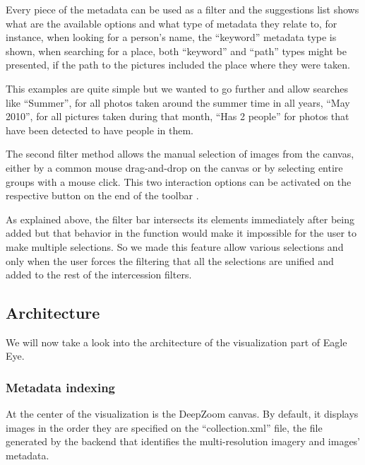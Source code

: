 Every piece of the metadata can be used as a filter and the suggestions list shows what are the available options and what type of metadata they relate to, for instance, when looking for a person's name, the ``keyword'' metadata type is shown, when searching for a place, both ``keyword'' and ``path'' types might be presented, if the path to the pictures included the place where they were taken.

This examples are quite simple but we wanted to go further and allow searches like ``Summer'', for all photos taken around the summer time in all years, ``May 2010'', for all pictures taken during that month, ``Has 2 people'' for photos that have been detected to have people in them. 

The second filter method allows the manual selection of images from the canvas, either by a common mouse drag-and-drop on the canvas or by selecting entire groups with a mouse click. This two interaction options can be activated on the respective button on the end of the toolbar . 

As explained above, the filter bar intersects its elements immediately after being added but that behavior in the function would make it impossible for the user to make multiple selections. So we made this feature allow various selections and only when the user forces the filtering that all the selections are unified and added to the rest of the intercession filters.




\subsection{Architecture}

We will now take a look into the architecture of the visualization part of Eagle Eye.

\subsubsection{Metadata indexing}

At the center of the visualization is the DeepZoom canvas. By default, it displays images in the order they are specified on the ``collection.xml'' file, the file generated by the backend that identifies the multi-resolution imagery and images' metadata.

